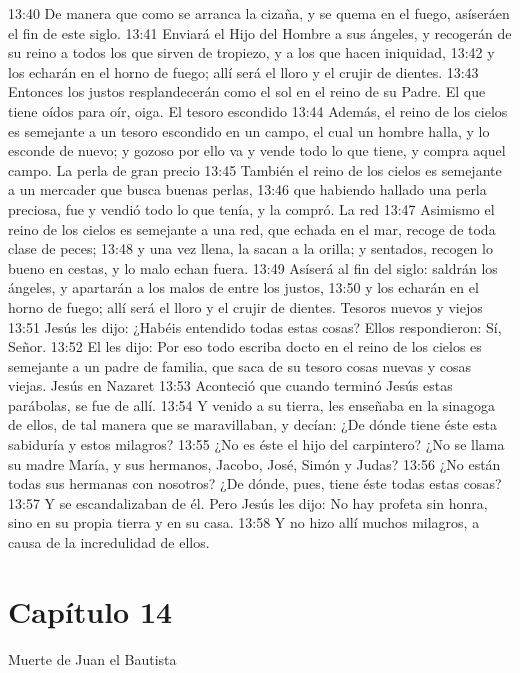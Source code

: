 13:40 De manera que como se arranca la cizaña, y se quema en el fuego, asíseráen el fin de este siglo. 
13:41 Enviará el Hijo del Hombre a sus ángeles, y recogerán de su reino a todos los que sirven de tropiezo, y a los que hacen iniquidad, 
13:42 y los echarán en el horno de fuego; allí será el lloro y el crujir de dientes. 
13:43 Entonces los justos resplandecerán como el sol en el reino de su Padre. El que tiene oídos para oír, oiga. 
El tesoro escondido 
13:44 Además, el reino de los cielos es semejante a un tesoro escondido en un campo, el cual un hombre halla, y lo esconde de nuevo; y gozoso por ello va y vende todo lo que tiene, y compra aquel campo. 
La perla de gran precio 
13:45 También el reino de los cielos es semejante a un mercader que busca buenas perlas, 
13:46 que habiendo hallado una perla preciosa, fue y vendió todo lo que tenía, y la compró. 
La red 
13:47 Asimismo el reino de los cielos es semejante a una red, que echada en el mar, recoge de toda clase de peces; 
13:48 y una vez llena, la sacan a la orilla; y sentados, recogen lo bueno en cestas, y lo malo echan fuera. 
13:49 Asíserá al fin del siglo: saldrán los ángeles, y apartarán a los malos de entre los justos, 
13:50 y los echarán en el horno de fuego; allí será el lloro y el crujir de dientes. 
Tesoros nuevos y viejos 
13:51 Jesús les dijo: ¿Habéis entendido todas estas cosas? Ellos respondieron: Sí, Señor. 
13:52 El les dijo: Por eso todo escriba docto en el reino de los cielos es semejante a un padre de familia, que saca de su tesoro cosas nuevas y cosas viejas. 
Jesús en Nazaret  
13:53 Aconteció que cuando terminó Jesús estas parábolas, se fue de allí. 
13:54 Y venido a su tierra, les enseñaba en la sinagoga de ellos, de tal manera que se maravillaban, y decían: ¿De dónde tiene éste esta sabiduría y estos milagros? 
13:55 ¿No es éste el hijo del carpintero? ¿No se llama su madre María, y sus hermanos, Jacobo, José, Simón y Judas? 
13:56 ¿No están todas sus hermanas con nosotros? ¿De dónde, pues, tiene éste todas estas cosas? 
13:57 Y se escandalizaban de él. Pero Jesús les dijo: No hay profeta sin honra, sino en su propia tierra y en su casa. 
13:58 Y no hizo allí muchos milagros, a causa de la incredulidad de ellos. 
\section*{Capítulo 14}
Muerte de Juan el Bautista  


